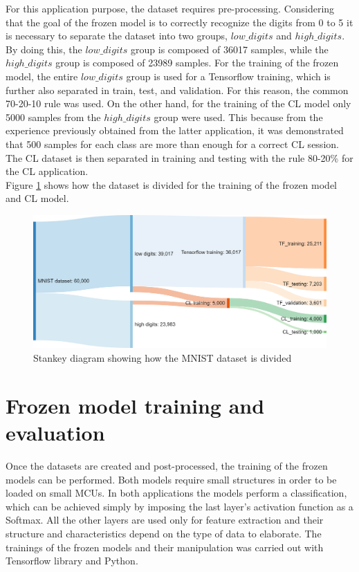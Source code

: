 \documentclass[12pt]{report}
\begin{document}
For this application purpose, the dataset requires pre-processing. Considering that the goal of the frozen model is to correctly recognize the digits from 0 to 5 it is necessary to separate the dataset into two groups, $low\_digits$ and $high\_digits$. By doing this, the $low\_digits$ group is composed of 36017 samples, while the $high\_digits$ group is composed of 23989 samples. For the training of the frozen model, the entire $low\_digits$ group is used for a Tensorflow training, which is further also separated in train, test, and validation. For this reason, the common 70-20-10 rule was used. On the other hand, for the training of the CL model only 5000 samples from the $high\_digits$ group were used. This because from the experience previously obtained from the latter application, it was demonstrated that 500 samples for each class are more than enough for a correct CL session. The CL dataset is then separated in training and testing with the rule 80-20\% for the CL application. \\
Figure \ref{fig:flow_dataset_openmv} shows how the dataset is divided for the training of the frozen model and CL model.

\begin{figure}[h!]
    \centering
    \includegraphics[width=120mm]{Figures/Chapter4/flow_dataset_openmv.png} 
    \caption{Stankey diagram showing how the MNIST dataset is divided}
    \label{fig:flow_dataset_openmv}    
\end{figure}

\section{Frozen model training and evaluation}
Once the datasets are created and post-processed, the training of the frozen models can be performed. Both models require small structures in order to be loaded on small MCUs. In both applications the models perform a classification, which can be achieved simply by imposing the last layer's activation function as a Softmax. All the other layers are used only for feature extraction and their structure and characteristics depend on the type of data to elaborate.
The trainings of the frozen models and their manipulation was carried out with Tensorflow library and Python.\\
\end{document}
